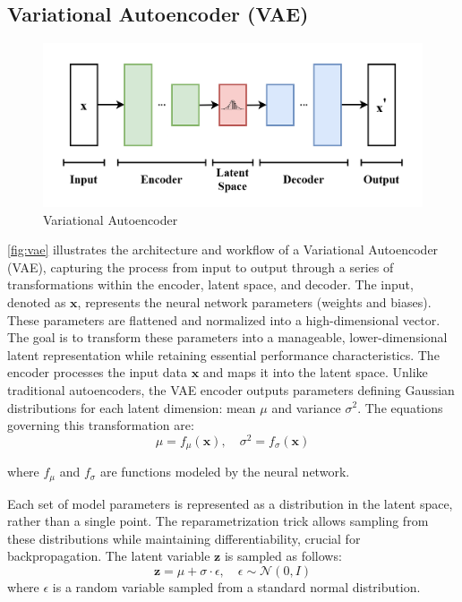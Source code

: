 \documentclass{ioereport}
\begin{document}
    \subsection{Variational Autoencoder (VAE) }
        \begin{figure}[H]
        \centering
        \includegraphics[width=0.95\linewidth]{assets/VAE_Basic.png}
        \caption{Variational Autoencoder}
        \label{fig:vae}
    \end{figure}
    \autoref{fig:vae} illustrates the architecture and workflow of a Variational Autoencoder (VAE), capturing the process from input to output through a series of transformations within the encoder, latent space, and decoder. The input, denoted as $\mathbf{x}$, represents the neural network parameters (weights and biases). These parameters are flattened and normalized into a high-dimensional vector. The goal is to transform these parameters into a manageable, lower-dimensional latent representation while retaining essential performance characteristics. The encoder processes the input data $\mathbf{x}$ and maps it into the latent space. Unlike traditional autoencoders, the VAE encoder outputs parameters defining Gaussian distributions for each latent dimension: mean $\mu$ and variance $\sigma^2$. The equations governing this transformation are:
    \begin{equation}
           \mu = f_{\mu}(\mathbf{x}), \quad \sigma^2 = f_{\sigma}(\mathbf{x})
    \end{equation}

    where $f_{\mu}$ and $f_{\sigma}$ are functions modeled by the neural network.

    Each set of model parameters is represented as a distribution in the latent space, rather than a single point. The reparametrization trick allows sampling from these distributions while maintaining differentiability, crucial for backpropagation. The latent variable $\mathbf{z}$ is sampled as follows:
    \begin{equation}
    \mathbf{z} = \mu + \sigma \cdot \epsilon, \quad \epsilon \sim \mathcal{N}(0, I)
    \end{equation}
    where $\epsilon$ is a random variable sampled from a standard normal distribution.
\end{document}
